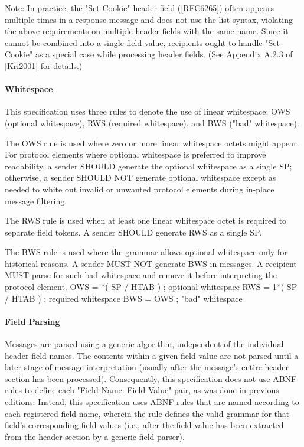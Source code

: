       Note: In practice, the "Set-Cookie" header field ([RFC6265]) often
      appears multiple times in a response message and does not use the
      list syntax, violating the above requirements on multiple header
      fields with the same name.  Since it cannot be combined into a
      single field-value, recipients ought to handle "Set-Cookie" as a
      special case while processing header fields.  (See Appendix A.2.3
      of [Kri2001] for details.)
\paragraph{Whitespace}
This specification uses three rules to denote the use of linear
whitespace: OWS (optional whitespace), RWS (required whitespace), and
BWS ("bad" whitespace).

The OWS rule is used where zero or more linear whitespace octets
might appear.  For protocol elements where optional whitespace is
preferred to improve readability, a sender SHOULD generate the
optional whitespace as a single SP; otherwise, a sender SHOULD NOT
generate optional whitespace except as needed to white out invalid or
unwanted protocol elements during in-place message filtering.

The RWS rule is used when at least one linear whitespace octet is
required to separate field tokens.  A sender SHOULD generate RWS as a
single SP.

The BWS rule is used where the grammar allows optional whitespace
only for historical reasons.  A sender MUST NOT generate BWS in
messages.  A recipient MUST parse for such bad whitespace and remove
it before interpreting the protocol element.
OWS            = *( SP / HTAB )
; optional whitespace
RWS            = 1*( SP / HTAB )
; required whitespace
BWS            = OWS
; "bad" whitespace
\paragraph{Field Parsing}
Messages are parsed using a generic algorithm, independent of the
individual header field names.  The contents within a given field
value are not parsed until a later stage of message interpretation
(usually after the message's entire header section has been
processed).  Consequently, this specification does not use ABNF rules
to define each "Field-Name: Field Value" pair, as was done in
previous editions.  Instead, this specification uses ABNF rules that
are named according to each registered field name, wherein the rule
defines the valid grammar for that field's corresponding field values
(i.e., after the field-value has been extracted from the header
section by a generic field parser).

